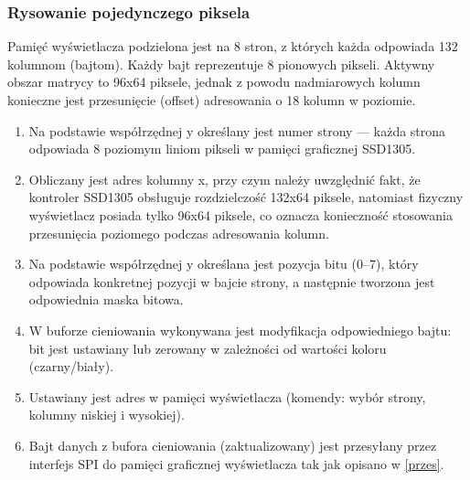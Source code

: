 \subsubsection {Rysowanie pojedynczego piksela}
\label{piksel}
Pamięć wyświetlacza podzielona jest na 8 stron, z których każda odpowiada 132 kolumnom (bajtom). Każdy bajt reprezentuje 8 pionowych pikseli. Aktywny obszar matrycy to 96x64 piksele, jednak z powodu nadmiarowych kolumn konieczne jest przesunięcie (offset) adresowania o 18 kolumn w poziomie.

\begin{enumerate}
    \item Na podstawie współrzędnej y określany jest numer strony — każda strona odpowiada 8 poziomym liniom pikseli w pamięci graficznej SSD1305.
    \item Obliczany jest adres kolumny x, przy czym należy uwzględnić fakt, że kontroler SSD1305 obsługuje rozdzielczość 132x64 piksele, natomiast fizyczny wyświetlacz posiada tylko 96x64 piksele, co oznacza konieczność stosowania przesunięcia poziomego podczas adresowania kolumn.
    \item Na podstawie współrzędnej y określana jest pozycja bitu (0–7), który odpowiada konkretnej pozycji w bajcie strony, a następnie tworzona jest odpowiednia maska bitowa.
    \item W buforze cieniowania wykonywana jest modyfikacja odpowiedniego bajtu: bit jest ustawiany lub zerowany w zależności od wartości koloru (czarny/biały).
    \item Ustawiany jest adres w pamięci wyświetlacza (komendy: wybór strony, kolumny niskiej i wysokiej).
    \item Bajt danych z bufora cieniowania (zaktualizowany) jest przesyłany przez interfejs SPI do pamięci graficznej wyświetlacza tak jak opisano w \ref{przes}.
\end{enumerate}

